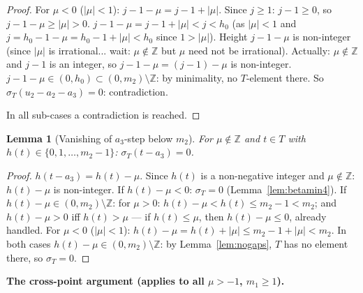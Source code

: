 \documentclass{article}
\newtheorem{lemma}{Lemma}
\begin{document}
\begin{proof}
For $\mu<0$ ($|\mu|<1$): $j-1-\mu=j-1+|\mu|$.
Since $j\ge 1$: $j-1\ge 0$, so $j-1-\mu\ge|\mu|>0$.
$j-1-\mu=j-1+|\mu|<j<h_0$ (as $|\mu|<1$ and $j=h_0-1-\mu=h_0-1+|\mu|<h_0$ since $1>|\mu|$).
Height $j-1-\mu$ is non-integer (since $|\mu|$ is irrational... wait: $\mu\notin\mathbb{Z}$ but $\mu$ need not be irrational).
Actually: $\mu\notin\mathbb{Z}$ and $j-1$ is an integer, so $j-1-\mu=(j-1)-\mu$ is non-integer.
$j-1-\mu\in(0,h_0)\subset(0,m_2)\setminus\mathbb{Z}$: by minimality, no $T$-element there.
So $\sigma_T(u_2-a_2-a_3)=0$: contradiction.

In all sub-cases a contradiction is reached.
\end{proof}

\begin{lemma}[Vanishing of $a_3$-step below $m_2$]\label{lem:a3vanish}
For $\mu\notin\mathbb{Z}$ and $t\in T$ with $h(t)\in\{0,1,\dots,m_2-1\}$\textup{:}
$\sigma_T(t-a_3)=0$.
\end{lemma}
\begin{proof}
$h(t-a_3)=h(t)-\mu$.  Since $h(t)$ is a non-negative integer and $\mu\notin\mathbb{Z}$:
$h(t)-\mu$ is non-integer.
If $h(t)-\mu<0$: $\sigma_T=0$ (Lemma~\ref{lem:betamin4}).
If $h(t)-\mu\in(0,m_2)\setminus\mathbb{Z}$:
for $\mu>0$: $h(t)-\mu<h(t)\le m_2-1<m_2$; and $h(t)-\mu>0$ iff $h(t)>\mu$ --- if $h(t)\le\mu$, then $h(t)-\mu\le 0$, already handled.
For $\mu<0$ ($|\mu|<1$): $h(t)-\mu=h(t)+|\mu|\le m_2-1+|\mu|<m_2$.
In both cases $h(t)-\mu\in(0,m_2)\setminus\mathbb{Z}$: by Lemma~\ref{lem:nogaps}, $T$ has no element there, so $\sigma_T=0$.
\end{proof}

\medskip
\noindent\textbf{The cross-point argument (applies to all $\mu>-1$, $m_1\ge 1$).}
\end{document}

